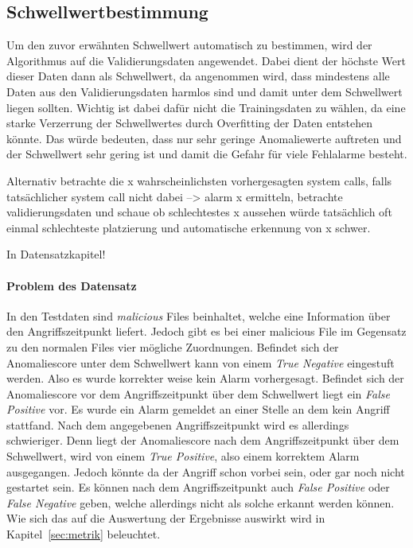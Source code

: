         \subsection{Schwellwertbestimmung}
            Um den zuvor erwähnten Schwellwert automatisch zu bestimmen, wird der Algorithmus auf die Validierungsdaten angewendet. 
            Dabei dient der höchste Wert dieser Daten dann als Schwellwert, da angenommen wird, dass mindestens alle Daten aus den Validierungsdaten harmlos sind und damit unter dem Schwellwert liegen sollten.
            Wichtig ist dabei dafür nicht die Trainingsdaten zu wählen, da eine starke Verzerrung der Schwellwertes durch Overfitting der Daten entstehen könnte. 
            Das würde bedeuten, dass nur sehr geringe Anomaliewerte auftreten und der Schwellwert sehr gering ist und damit die Gefahr für viele Fehlalarme besteht.

            Alternativ betrachte die x wahrscheinlichsten vorhergesagten system calls, falls tatsächlicher system call nicht dabei --> alarm
            x ermitteln, betrachte validierungsdaten und schaue ob schlechtestes x aussehen würde
            tatsächlich oft einmal schlechteste platzierung und automatische erkennung von x schwer.

            {\color{red} In Datensatzkapitel!}
            \paragraph{Problem des Datensatz}

                In den Testdaten sind \textit{malicious}  Files beinhaltet, welche eine Information über den Angriffszeitpunkt liefert. 
                Jedoch gibt es bei einer malicious File im Gegensatz zu den normalen Files  vier mögliche Zuordnungen.
                Befindet sich der Anomaliescore unter dem Schwellwert kann von einem \textit{True Negative} eingestuft werden.
                Also es wurde korrekter weise kein Alarm vorhergesagt.
                Befindet sich der Anomaliescore vor dem Angriffszeitpunkt über dem Schwellwert liegt ein \textit{False Positive} vor.
                Es wurde ein Alarm gemeldet an einer Stelle an dem kein Angriff stattfand.
                Nach dem angegebenen Angriffszeitpunkt wird es allerdings schwieriger.
                Denn liegt der Anomaliescore nach dem Angriffszeitpunkt über dem Schwellwert, wird von einem \textit{True Positive}, also einem korrektem Alarm ausgegangen.
                Jedoch könnte da der Angriff schon vorbei sein, oder gar noch nicht gestartet sein.
                Es können nach dem Angriffszeitpunkt auch \textit{False Positive} oder \textit{False Negative} geben, welche allerdings nicht als solche erkannt werden können.
                Wie sich das auf die Auswertung der Ergebnisse auswirkt wird in Kapitel~\ref{sec:metrik} beleuchtet.

